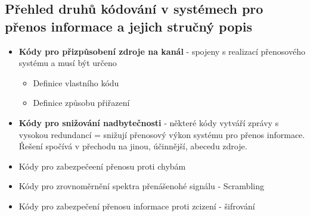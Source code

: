 \subsection{Přehled druhů kódování v systémech pro přenos informace a jejich stručný popis}
\begin{itemize}
    \item  \textbf{Kódy pro přizpůsobení zdroje na kanál} - spojeny s realizací přenosového systému a musí být určeno
\begin{itemize}
    \item Definice vlastního kódu
    \item Definice způsobu přiřazení
\end{itemize}
\item \textbf{Kódy pro snižování nadbytečnosti} - některé kódy vytváří zprávy s vysokou redundancí = snižují přenosový výkon systému pro přenos informace. Řešení spočívá v přechodu na jinou, účinnější, abecedu zdroje.
\item Kódy pro zabezpečeení přenosu proti chybám
\item Kódy pro zrovnoměrnění spektra přenášenohé signálu - Scrambling
\item Kódy pro zabezpečení přenosu informace proti zcizení - šifrování
\end{itemize}
